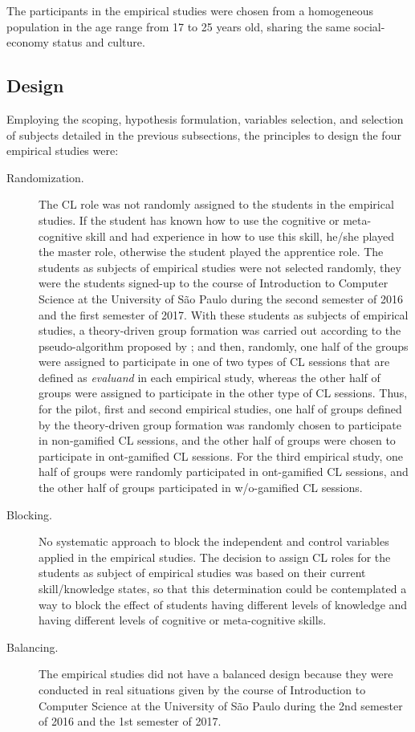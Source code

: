 The participants in the empirical studies were chosen from a homogeneous population in the age range from 17 to 25 years old, sharing the same social-economy status and culture.

\subsection{Design}

Employing the scoping, hypothesis formulation, variables selection, and selection of subjects detailed in the previous subsections, the principles to design the four empirical studies were:

\begin{description}
\item[Randomization.] The CL role was not randomly assigned to the students in the empirical studies.
If the student has known how to use the cognitive or meta-cognitive skill and had experience in how to use this skill, he/she played the master role, otherwise the student played the apprentice role.
The students as subjects of empirical studies were not selected randomly, they were the students signed-up to the course of Introduction to Computer Science at the University of São Paulo during the second semester of 2016 and the first semester of 2017.
With these students as subjects of empirical studies, a theory-driven group formation was carried out according to the pseudo-algorithm proposed by ; and then, randomly, one half of the groups were assigned to participate in one of two types of CL sessions that are defined as \emph{evaluand} in each empirical study, whereas the other half of groups were assigned to participate in the other type of CL sessions.
Thus, for the pilot, first and second empirical studies, one half of groups defined by the theory-driven group formation was randomly chosen to participate in non-gamified CL sessions, and the other half of groups were chosen to participate in ont-gamified CL sessions.
For the third empirical study, one half of groups were randomly participated in ont-gamified CL sessions, and the other half of groups participated in w/o-gamified CL sessions.

\item[Blocking.]
No systematic approach to block the independent and control variables applied in the empirical studies.
The decision to assign CL roles for the students as subject of empirical studies was based on their current skill/knowledge states, so that this determination could be contemplated a way to block the effect of students having different levels of knowledge and having different levels of cognitive or meta-cognitive skills. 

\item[Balancing.] The empirical studies did not have a balanced design because they were conducted in real situations given by the course of Introduction to Computer Science at the University of São Paulo during the 2nd semester of 2016 and the 1st semester of 2017.
\end{description}

